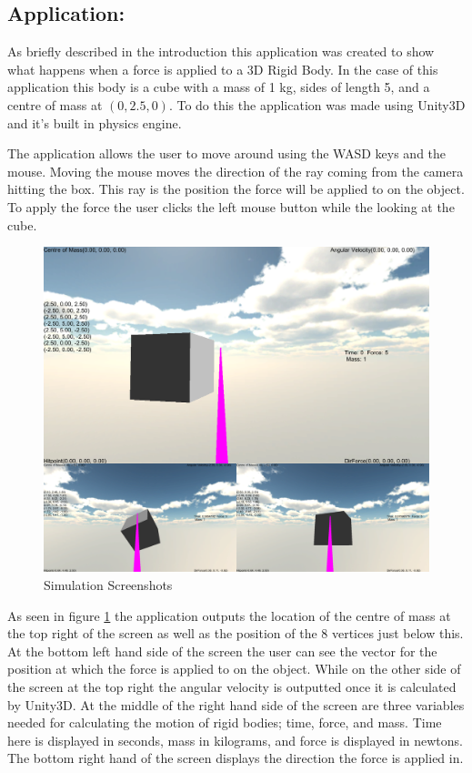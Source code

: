 \subsection{Application:}\label{sc:App}
As briefly described in the introduction this application was created to show what happens when a force is applied to a 3D Rigid Body.
In the case of this application this body is a cube with a mass of 1 kg, sides of length 5, and a centre of mass at $(0,2.5,0)$.
To do this the application was made using \citet{unity2013} Unity3D and it's built in physics engine.

The application allows the user to move around using the WASD keys and the mouse.
Moving the mouse moves the direction of the ray coming from the camera hitting the box.
This ray is the position the force will be applied to on the object.
To apply the force the user clicks the left mouse button while the looking at the cube.

\begin{figure}[h!]
	\centering
	\includegraphics[width=\textwidth]{images/Simulation.PNG}
	\caption{Simulation Screenshots}
	\label{fig:Simulation}
\end{figure}

As seen in figure \ref{fig:Simulation} the application outputs the location of the centre of mass at the top right of the screen as well as the position of the 8 vertices just below this.
At the bottom left hand side of the screen the user can see the vector for the position at which the force is applied to on the object.
While on the other side of the screen at the top right the angular velocity is outputted once it is calculated by Unity3D.
At the middle of the right hand side of the screen are three variables needed for calculating the motion of rigid bodies; time, force, and mass.
Time here is displayed in seconds, mass in kilograms, and force is displayed in newtons.
The bottom right hand of the screen displays the direction the force is applied in.